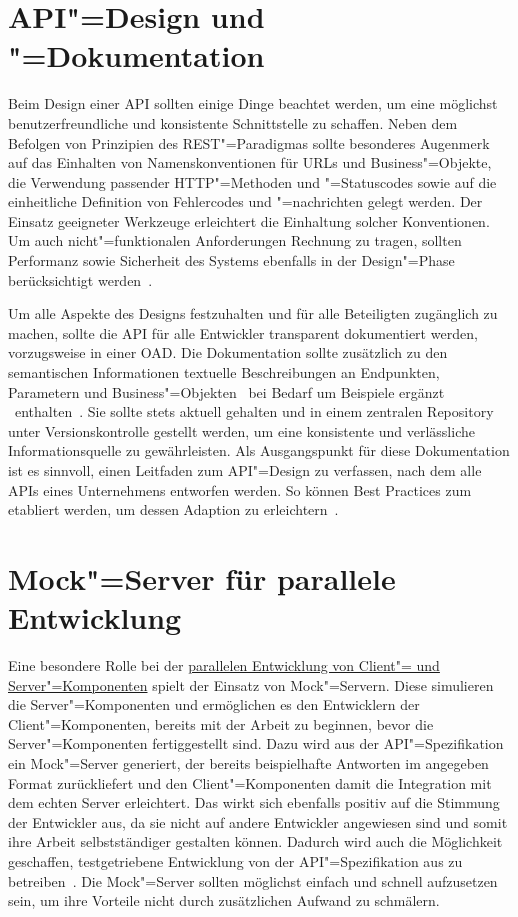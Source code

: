 \section{API"=Design und "=Dokumentation}
Beim Design einer \ac{API} sollten einige Dinge beachtet werden, um eine möglichst benutzerfreundliche und konsistente Schnittstelle zu schaffen.
Neben dem Befolgen von Prinzipien des \ac{REST}"=Paradigmas sollte besonderes Augenmerk auf das Einhalten von Namenskonventionen für \acp{URL} und Business"=Objekte, die Verwendung passender \ac{HTTP}"=Methoden und "=Statuscodes sowie auf die einheitliche Definition von Fehlercodes und "=nachrichten gelegt werden.
Der Einsatz geeigneter Werkzeuge erleichtert die Einhaltung solcher Konventionen.
Um auch nicht"=funktionalen Anforderungen Rechnung zu tragen, sollten Performanz sowie Sicherheit des Systems ebenfalls in der Design"=Phase berücksichtigt werden~\cite[352-354,360]{de23}.

Um alle Aspekte des Designs festzuhalten und für alle Beteiligten zugänglich zu machen, sollte die \ac{API} für alle Entwickler transparent dokumentiert werden, vorzugsweise in einer \ac{OAD}.
Die Dokumentation sollte zusätzlich zu den semantischen Informationen textuelle Beschreibungen an Endpunkten, Parametern und Business"=Objekten \textendash\ bei Bedarf um Beispiele ergänzt \textendash\ enthalten~\cite[353]{de23}.
Sie sollte stets aktuell gehalten und in einem zentralen Repository unter Versionskontrolle gestellt werden, um eine konsistente und verlässliche Informationsquelle zu gewährleisten.
Als Ausgangspunkt für diese Dokumentation ist es sinnvoll, einen Leitfaden zum \ac{API}"=Design zu verfassen, nach dem alle \acp{API} eines Unternehmens entworfen werden.
So können \foreignlanguage{american}{Best Practices} zum \AFA etabliert werden, um dessen Adaption zu erleichtern~\cites[3\psq]{kul23}[359]{de23}.

\section{Mock"=Server für parallele Entwicklung}
\label{sec:mock-server}
Eine besondere Rolle bei der \hyperref[sec:parallel-dev]{parallelen Entwicklung von Client"= und Server"=Komponenten} spielt der Einsatz von Mock"=Servern.
Diese simulieren die Server"=Komponenten und ermöglichen es den Entwicklern der Client"=Komponenten, bereits mit der Arbeit zu beginnen, bevor die Server"=Komponenten fertiggestellt sind.
Dazu wird aus der \ac{API}"=Spezifikation ein Mock"=Server generiert, der bereits beispielhafte Antworten im angegeben Format zurückliefert und den Client"=Komponenten damit die Integration mit dem echten Server erleichtert.
Das wirkt sich ebenfalls positiv auf die Stimmung der Entwickler aus, da sie nicht auf andere Entwickler angewiesen sind und somit ihre Arbeit selbstständiger gestalten können.
Dadurch wird auch die Möglichkeit geschaffen, testgetriebene Entwicklung von der \ac{API}"=Spezifikation aus zu betreiben~\cite[351,353]{de23}.
Die Mock"=Server sollten möglichst einfach und schnell aufzusetzen sein, um ihre Vorteile nicht durch zusätzlichen Aufwand zu schmälern.